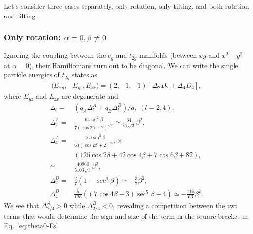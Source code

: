 \documentclass[a4paper,prb,twocolumn]{revtex4-1}  %
\begin{document}
Let's consider three cases separately, only rotation, only tilting, and both rotation and tilting.

\subsubsection{Only rotation: $\alpha=0,\beta\neq 0$}
\label{sec:alpha0}


Ignoring the coupling between the $e_{g}$ and $t_{2g}$ manifolds (between $xy$ and $x^2-y^2$ at $\alpha=0$),
their Hamiltonians turn out to be diagonal.
We can write the single particle energies of $t_{2g}$ states
as
\begin{align}
\label{eq:theta0-Es}
(E_{xy},&E_{yz},E_{zx})= (2, -1, -1)
\left[\frac{}{} \Delta_{2}  D_2 + \Delta_4 D_4\right],
 \end{align}
 where $E_{yz}$ and $E_{zx}$ are degenerate and 
\begin{align}
\Delta_{l} =&  \left(q_A \Delta_{l}^A + q_B\Delta_{l}^B\right)/a,~(l=2,4),\\
\Delta_{2}^A =& 
\frac{64 \sin ^2\beta }{7 (\cos 2 \beta +2)^{5/2}} %
 \simeq \frac{64}{63 \sqrt{3}}\beta ^2,\\
\Delta_4^A =&
 \frac{160 \sin ^2\beta}{63 (\cos 2\beta+2)^{9/2}} \times \\
&  (125 \cos 2\beta+42 \cos 4\beta+7 \cos 6\beta+82),\\
\simeq& \frac{40960}{5103 \sqrt{3}}\beta ^2,\\
 \label{eq:theta0-delB2}
\Delta_{2}^B =& \frac{2}{7} \left(1-\sec ^3\beta\right)
\simeq -\frac{3}{7}\beta ^2,\\
\label{eq:theta0-delB4}
  \Delta_4^B =&\frac{5}{126} \left((7 \cos 4\beta-3) \sec ^5\beta-4\right)
  \simeq -\frac{115}{63}\beta ^2.
 \end{align}
 We see that $\Delta_{2/4}^A>0$ while $\Delta_{2/4}^B<0$,
 revealing a competition between the two terms 
 that would determine the sign and size of the term
  in the square bracket in Eq.~\ref{eq:theta0-Es} 
\end{document}
